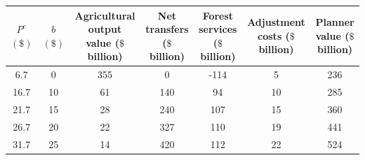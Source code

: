 \begin{tabular}{ccccccc}
\toprule
\makecell[c]{$P^e$ \\ $(\$)$} & \makecell[c]{$b$ \\ $(\$)$} & \makecell[c]{Agricultural \\ output value \\ ($\$$ billion)} & \makecell[c]{Net \\ transfers \\ ($\$$ billion)} & \makecell[c]{Forest \\ services \\ ($\$$ billion)} & \makecell[c]{Adjustment \\ costs \\ ($\$$ billion)} & \makecell[c]{Planner \\ value \\ ($\$$ billion)} \\
\midrule
 6.7 & 0 & 355 & 0 & -114 & 5 & 236 \\
 16.7 & 10 & 61 & 140 & 94 & 10 & 285 \\
 21.7 & 15 & 28 & 240 & 107 & 15 & 360 \\
 26.7 & 20 & 22 & 327 & 110 & 19 & 441 \\
 31.7 & 25 & 14 & 420 & 112 & 22 & 524 \\
\bottomrule
\end{tabular}
